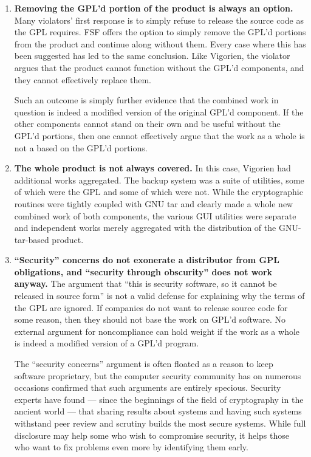\begin{enumerate}

\item {\bf Removing the GPL'd portion of the product is always an
  option.}  Many violators' first response is to simply refuse to
  release the source code as the GPL requires. FSF offers the option to
  simply remove the GPL'd portions from the product and continue along
  without them. Every case where this has been suggested has led to
  the same conclusion. Like Vigorien, the violator argues that the
  product cannot function without the GPL'd components, and they
  cannot effectively replace them.

  Such an outcome is simply further evidence that the combined work in
  question is indeed a modified version of the original GPL'd component.
  If the other components cannot stand on their own and be useful without
  the GPL'd portions, then one cannot effectively argue that the work as a
  whole is not a based on the GPL'd portions.

\item {\bf The whole product is not always covered.}  In this case,
  Vigorien had additional works aggregated. The backup system was a suite
  of utilities, some of which were the GPL and some of which were not. While
  the cryptographic routines were tightly coupled with GNU tar and clearly
  made a whole new combined work of both components, the various GUI utilities were separate and
  independent works merely aggregated with the distribution of the
  GNU-tar-based product.


\item {\bf ``Security'' concerns do not exonerate a distributor from GPL
  obligations, and ``security through obscurity'' does not work anyway.}
  The argument that ``this is security software, so it cannot be released
  in source form'' is not a valid defense for explaining why the terms of
  the GPL are ignored. If companies do not want to release source code
  for some reason, then they should not base the work on GPL'd software.
  No external argument for noncompliance can hold weight if the work as
  a whole is indeed a modified version of a GPL'd program.

  The ``security concerns'' argument is often floated as a reason to keep
  software proprietary, but the computer security community has on
  numerous occasions confirmed that such arguments are entirely specious.
  Security experts have found --- since the beginnings of the field of
  cryptography in the ancient world --- that sharing results about systems
  and having such systems withstand peer review and scrutiny builds the
  most secure systems. While full disclosure may help some who wish to
  compromise security, it helps those who want to fix problems even more
  by identifying them early.


\end{enumerate}
